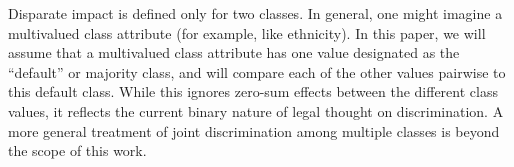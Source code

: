 
\vspace*{0.1in} Disparate impact is defined only for two classes. In general, one might imagine a multivalued class attribute (for example, like ethnicity). In this paper, we will assume that a multivalued class attribute has one value designated as the ``default'' or majority class, and will compare each of the other values pairwise to this default class. While this ignores zero-sum effects between the different class values, it reflects the current binary nature of legal thought on discrimination. A more general treatment of joint discrimination among multiple classes is beyond the scope of this work.


